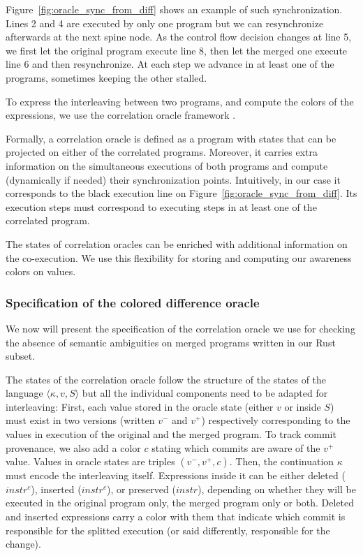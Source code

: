 \documentclass[a4paper,11pt]{article}
\newcommand\rtstate[3]{\langle #1, #2, #3\rangle}
\begin{document}
Figure~\ref{fig:oracle_sync_from_diff} shows an example of such synchronization. Lines 2 and 4 are executed by only one program but we can resynchronize afterwards at the next spine node. As the control flow decision changes at line 5, we first let the original program execute line 8, then let the merged one execute line 6 and then resynchronize. At each step we advance in at least one of the programs, sometimes keeping the other stalled.

To express the interleaving between two programs, and compute the
colors of the expressions, we use the correlation oracle framework \cite{girka2017verifiable}.

Formally, a correlation oracle is defined as a program with states
that can be projected on either of the correlated programs.
Moreover, it carries extra information on the simultaneous executions of
both programs and compute (dynamically if needed) their synchronization points.
Intuitively, in our case it corresponds to the black execution line on Figure~\ref{fig:oracle_sync_from_diff}.
Its execution steps must correspond to executing steps in at least one of the correlated program.

The states of correlation oracles can be enriched with additional information on the co-execution. We use this flexibility for storing and computing our awareness colors on values.

\subsubsection{Specification of the colored difference oracle}

We now will present the specification of the correlation oracle we use for checking the absence of semantic ambiguities on merged programs written in our Rust subset.

The states of the correlation oracle follow the structure of the states of the language $\rtstate{\kappa}{v}{S}$ but all the individual components need to be adapted for interleaving:
First, each value stored in the oracle state (either $v$ or inside $S$) must exist in two versions (written $v^-$ and $v^+$) respectively corresponding to the values in execution of the original and the merged program. To track commit provenance, we also add a color $c$ stating which commits are aware of the $v^+$ value. Values in oracle states are triples $(v^-, v^+, c)$.
Then, the continuation $\kappa$ must encode the interleaving itself. Expressions inside it can be either deleted (\st{$instr$}$^c$), inserted (\ul{$instr$}$^c$), or preserved ($instr$), depending on whether they will be executed in the original program only, the merged program only or both.
Deleted and inserted expressions carry a color with them that indicate which commit is responsible for the splitted execution (or said differently, responsible for the change).
\end{document}
